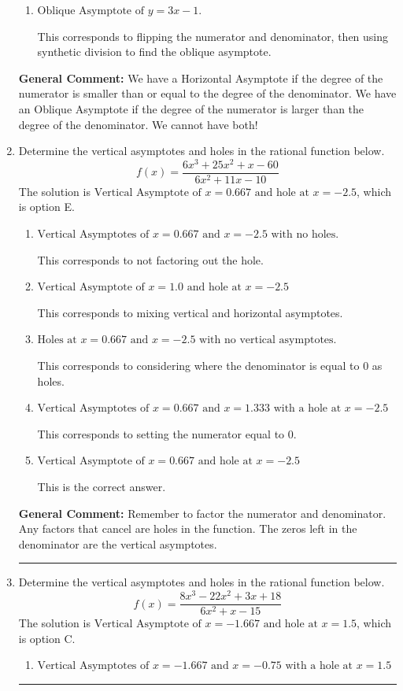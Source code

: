 \documentclass{extbook}[14pt]
\newcommand{\litem}[1]{\item #1

\rule{\textwidth}{0.4pt}}
\begin{document}
\begin{enumerate}
{\begin{enumerate}[label=\Alph*.]
* This is the correct option.
\item \( \text{Oblique Asymptote of } y = 3x -1. \)

This corresponds to flipping the numerator and denominator, then using synthetic division to find the oblique asymptote.
\end{enumerate}

\textbf{General Comment:} We have a Horizontal Asymptote if the degree of the numerator is smaller than or equal to the degree of the denominator. We have an Oblique Asymptote if the degree of the numerator is larger than the degree of the denominator. We cannot have both!
}
\litem{
Determine the vertical asymptotes and holes in the rational function below.
\[ f(x) = \frac{6x^{3} +25 x^{2} +x -60}{6x^{2} +11 x -10} \]The solution is \( \text{Vertical Asymptote of } x = 0.667 \text{ and hole at } x = -2.5 \), which is option E.\begin{enumerate}[label=\Alph*.]
\item \( \text{Vertical Asymptotes of } x = 0.667 \text{ and } x = -2.5 \text{ with no holes.} \)

This corresponds to not factoring out the hole.
\item \( \text{Vertical Asymptote of } x = 1.0 \text{ and hole at } x = -2.5 \)

This corresponds to mixing vertical and horizontal asymptotes.
\item \( \text{Holes at } x = 0.667 \text{ and } x = -2.5 \text{ with no vertical asymptotes.} \)

This corresponds to considering where the denominator is equal to 0 as holes.
\item \( \text{Vertical Asymptotes of } x = 0.667 \text{ and } x = 1.333 \text{ with a hole at } x = -2.5 \)

This corresponds to setting the numerator equal to 0.
\item \( \text{Vertical Asymptote of } x = 0.667 \text{ and hole at } x = -2.5 \)

This is the correct answer.
\end{enumerate}

\textbf{General Comment:} Remember to factor the numerator and denominator. Any factors that cancel are holes in the function. The zeros left in the denominator are the vertical asymptotes.
}
\litem{
Determine the vertical asymptotes and holes in the rational function below.
\[ f(x) = \frac{8x^{3} -22 x^{2} +3 x + 18}{6x^{2} +x -15} \]The solution is \( \text{Vertical Asymptote of } x = -1.667 \text{ and hole at } x = 1.5 \), which is option C.\begin{enumerate}[label=\Alph*.]
\item \( \text{Vertical Asymptotes of } x = -1.667 \text{ and } x = -0.75 \text{ with a hole at } x = 1.5 \)


\end{enumerate}}
\end{enumerate}
\end{document}
